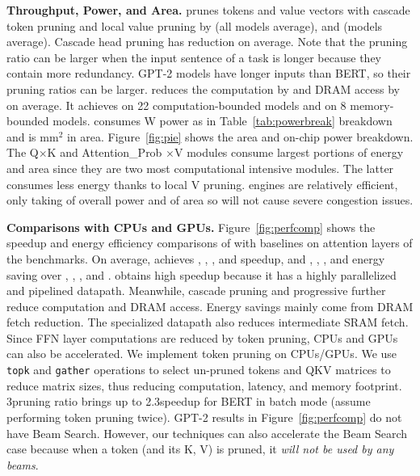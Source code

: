 \textbf{Throughput, Power, and Area.}
\name prunes tokens and value vectors with cascade token pruning and local value pruning by \prunedramsaving\x (all models average), and \prunegpttwodramsaving\x (\gpttwo models average). Cascade head pruning has \hpdramsaving\x reduction on average. Note that the pruning ratio can be larger when the input sentence of a task is longer because they contain more redundancy. GPT-2 models have longer inputs than BERT, so their pruning ratios can be larger.
\name reduces the computation by \totalcompsaving\x and DRAM access by \totaldramsaving\x on average. It achieves \spattenbertflops\tflopss on 22 computation-bounded \bert models and \spattengpttwoflops\tflopss on 8 memory-bounded \gpttwo models. {\spattenfull} consumes \powerspattenfull W power as in Table~\ref{tab:powerbreak} breakdown and is \areaspattenfull mm$^2$ in area. 
Figure~\ref{fig:pie} shows the area and on-chip power breakdown. 
The Q$\times$K and Attention\_Prob $\times$V modules consume largest portions of energy and area since they are two most computational intensive modules. The latter consumes less energy thanks to local V pruning. \topk engines are relatively efficient, only taking \topkpowerratio\xspace of overall power and \topkarearatio\xspace of area so will not cause severe congestion issues.


\textbf{Comparisons with CPUs and GPUs.}
Figure~\ref{fig:perfcomp} shows the speedup and energy efficiency comparisons of \spattenfull\xspace with baselines on attention layers of the benchmarks. 
On average, \name achieves \perfovertitanxp\x, \perfoverxeon\x, \perfovernano\x, and \perfoverrasp\x speedup, and \eeovertitanxp\x, \eeoverxeon\x, \eeovernano\x, and \eeoverrasp\x energy saving over \titanxp, \xeon, \nano, and \rasp.
\name obtains high speedup because it has a highly parallelized and pipelined datapath. Meanwhile, cascade pruning and progressive \lowprec further reduce computation and DRAM access. Energy savings mainly come from DRAM fetch reduction. The specialized datapath also reduces intermediate SRAM fetch. 
Since FFN layer computations are reduced by token pruning, CPUs and GPUs can also be accelerated. 
We implement token pruning on CPUs/GPUs. We use \texttt{topk} and \texttt{gather} operations to select un-pruned tokens and QKV matrices to reduce matrix sizes, thus reducing computation, latency, and memory footprint. 3\x pruning ratio brings up to 2.3\x speedup for BERT in batch mode (assume performing token pruning twice). GPT-2 results in Figure~\ref{fig:perfcomp} do not have Beam Search. However, our techniques can also accelerate the Beam Search case because when a token (and its K, V) is pruned, it \emph{will not be used by any beams}.

